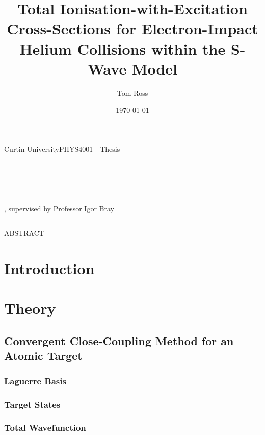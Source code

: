 \documentclass[draft]{article}
\title{Total Ionisation-with-Excitation Cross-Sections for Electron-Impact
  Helium Collisions within the S-Wave Model}
\author{Tom Ross}
\date{\today}
\gdef\theassessment{PHYS4001 - Thesis}
\gdef\thesupervisor{Professor Igor Bray}
\gdef\theinstitution{Curtin University}
\begin{document}

\begin{titlepage}
  \begin{flushleft}
    \theinstitution \hfill \theassessment
  \end{flushleft}
  \hrule
  \begin{center}
    {\huge\thetitle}
    \\
    \rule[1.0pt]{8.5cm}{0.4pt}
    \\
    {\large \theauthor, supervised by \thesupervisor}
  \end{center}
  \hrule
  \begin{center}
    ABSTRACT
  \end{center}
\end{titlepage}

\clearpage


\tableofcontents

\listoffigures



\clearpage

\section{Introduction}
\label{sec:introduction}

\section{Theory}
\label{sec:theory}

\subsection{Convergent Close-Coupling Method for an Atomic Target}
\label{sec:ccc-method}

\subsubsection{Laguerre Basis}
\label{sec:laguerre-basis}

\subsubsection{Target States}
\label{sec:target-states}

\subsubsection{Total Wavefunction}
\label{sec:total-wavefunction}
\end{document}
